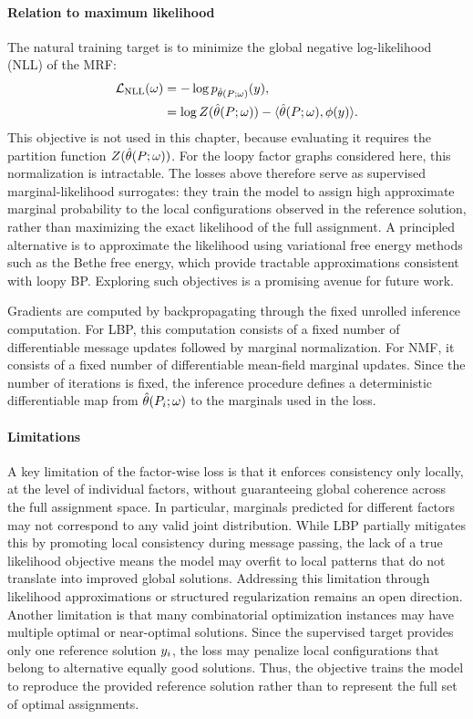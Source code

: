 \paragraph{Relation to maximum likelihood}
The natural training target is to minimize the global negative log-likelihood (NLL) of the MRF:
\begin{align}
\mathcal{L}_{\mathrm{NLL}}(\omega) &= -\log p_{\hat{\theta}(P;\omega)}(y), \\
                                   &= \log Z(\hat{\theta}(P;\omega)) - \langle \hat{\theta}(P;\omega), \phi(y) \rangle.
\end{align}
This objective is not used in this chapter, because evaluating it requires the partition function $Z(\hat{\theta}(P;\omega))$. For the loopy factor graphs considered here, this normalization is intractable. The losses above therefore serve as supervised marginal-likelihood surrogates: they train the model to assign high approximate marginal probability to the local configurations observed in the reference solution, rather than maximizing the exact likelihood of the full assignment. A principled alternative is to approximate the likelihood using variational free energy methods such as the Bethe free energy, which provide tractable approximations consistent with loopy BP. Exploring such objectives is a promising avenue for future work.

Gradients are computed by backpropagating through the fixed unrolled inference computation. For LBP, this computation consists of a fixed number of differentiable message updates followed by marginal normalization. For NMF, it consists of a fixed number of differentiable mean-field marginal updates. Since the number of iterations is fixed, the inference procedure defines a deterministic differentiable map from $\hat{\theta}(P_i;\omega)$ to the marginals used in the loss.

\paragraph{Limitations} 
A key limitation of the factor-wise loss is that it enforces consistency only locally, at the level of individual factors, without guaranteeing global coherence across the full assignment space. In particular, marginals predicted for different factors may not correspond to any valid joint distribution. While LBP partially mitigates this by promoting local consistency during message passing, the lack of a true likelihood objective means the model may overfit to local patterns that do not translate into improved global solutions. Addressing this limitation through likelihood approximations or structured regularization remains an open direction. Another limitation is that many combinatorial optimization instances may have multiple optimal or near-optimal solutions. Since the supervised target provides only one reference solution $y_i$, the loss may penalize local configurations that belong to alternative equally good solutions. Thus, the objective trains the model to reproduce the provided reference solution rather than to represent the full set of optimal assignments.

